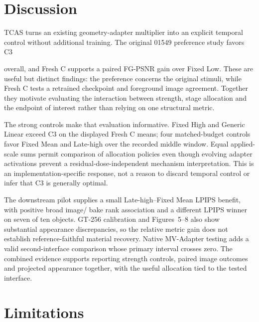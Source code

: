 \documentclass[times,twocolumn,final]{elsarticle}
\providecommand{\DIFadd}[1]{{\protect\color{blue} \sf #1}} %
\providecommand{\DIFaddbegin}{} %
\providecommand{\DIFaddend}{} %
\providecommand{\DIFaddFL}[1]{\DIFadd{#1}} %
\providecommand{\DIFaddbeginFL}{\DIFaddbegin} %
\providecommand{\DIFaddendFL}{\DIFaddend} %
\renewcommand{\DIFaddbeginFL}{}
\renewcommand{\DIFaddendFL}{}
\renewcommand{\DIFaddFL}[1]{#1}
\begin{document}
  \DIFaddbegin \section{Discussion}
\DIFadd{TCAS turns an existing geometry-adapter multiplier into an explicit temporal control without additional training. The original 01549 preference study favors }\DIFaddend C3  






 \DIFaddbegin \DIFadd{overall, and Fresh C supports a paired FG-PSNR gain over Fixed Low. These are useful but distinct findings: }\DIFaddend the   \DIFaddbegin \DIFadd{preference concerns the original stimuli, while Fresh C tests a retrained checkpoint and foreground image agreement. Together they motivate evaluating the interaction between strength, stage allocation and the endpoint of interest rather than relying on one structural metric}\DIFaddend .

  \DIFaddbegin \DIFadd{The strong controls make that evaluation informative. Fixed High and Generic Linear exceed }\DIFaddend C3   \DIFaddbegin \DIFadd{on the displayed Fresh C means; four matched-budget controls favor Fixed Mean and Late-high over the recorded middle window. Equal applied-scale sums permit comparison of allocation policies even though evolving adapter activations prevent a residual-dose-independent mechanism interpretation. This is an implementation-specific response, not a reason to discard temporal control or infer that C3 is generally optimal.
}\DIFaddend 

  \DIFaddbeginFL \DIFaddFL{The downstream pilot supplies a small Late-high--Fixed Mean LPIPS benefit, with positive broad image}\DIFaddendFL /  \DIFaddbegin \DIFadd{bake rank association and a different LPIPS winner on seven of ten objects. GT-256 calibration and Figures~5--8 also show substantial appearance discrepancies, so the relative metric gain does not establish reference-faithful material recovery. Native MV-Adapter testing adds a valid second-interface comparison whose primary interval crosses zero. The combined evidence supports reporting strength controls, paired image outcomes and projected appearance together, with the useful allocation tied to the tested interface.
}\DIFaddend 

\section{Limitations}
\label{sec:limitations}
 
\end{document}
